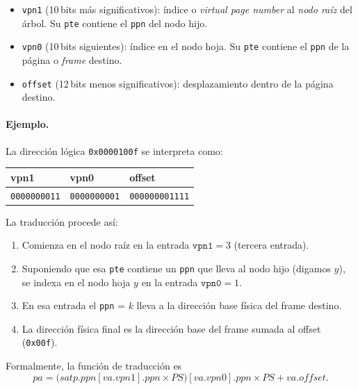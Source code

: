\documentclass[11pt,a4paper]{article}
\begin{document}
\begin{itemize}[leftmargin=*,nosep]
    \item \texttt{vpn1} (10\,bits más significativos): índice o
        \emph{virtual page number} al \emph{nodo raíz} del árbol. Su
        \texttt{pte} contiene el \texttt{ppn} del nodo hijo.
    \item \texttt{vpn0} (10\,bits siguientes): índice en el nodo hoja.
        Su \texttt{pte} contiene el \texttt{ppn} de la página o
        \emph{frame} destino.
    \item \texttt{offset} (12\,bits menos significativos): desplazamiento
        dentro de la página destino.
\end{itemize}

\paragraph{Ejemplo.}
La dirección lógica \texttt{0x0000100f} se interpreta como:

\begin{center}
\begin{tabular}{@{}lll@{}}
\textbf{vpn1} & \textbf{vpn0} & \textbf{offset} \\
\midrule
\texttt{0000000011} & \texttt{0000000001} & \texttt{000000001111} \\
\end{tabular}
\end{center}

La traducción procede así:

\begin{enumerate}[leftmargin=*]
    \item Comienza en el nodo raíz en la entrada $\texttt{vpn1}=3$
        (tercera entrada).
    \item Suponiendo que esa \texttt{pte} contiene un \texttt{ppn} que
        lleva al nodo hijo (digamos $y$), se indexa en el nodo hoja
        $y$ en la entrada $\texttt{vpn0}=1$.
    \item En esa entrada el \texttt{ppn} = $k$ lleva a la dirección
        base física del frame destino.
    \item La dirección física final es la dirección base del frame
        sumada al offset (\texttt{0x00f}).
\end{enumerate}

Formalmente, la función de traducción es
\[
\textit{pa} = \bigl(\textit{satp}.\textit{ppn}[\textit{va}.\textit{vpn1}].\textit{ppn} \times PS\bigr)[\textit{va}.\textit{vpn0}].\textit{ppn} \times PS + \textit{va}.\textit{offset}.
\]
\end{document}
